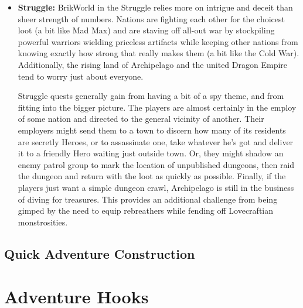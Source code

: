 \documentclass[12pt,a4paper,twocolumn]{article}
\begin{document}
\begin{itemize}
\item {\bf Struggle:} BrikWorld in the Struggle relies more on intrigue and deceit than sheer strength of numbers.  Nations are fighting each other for the choicest loot (a bit like Mad Max) and are staving off all-out war by stockpiling powerful warriors wielding priceless artifacts while keeping other nations from knowing exactly how strong that really makes them (a bit like the Cold War).  Additionally, the rising land of Archipelago and the united Dragon Empire tend to worry just about everyone.

Struggle quests generally gain from having a bit of a spy theme, and from fitting into the bigger picture.  The players are almost certainly in the employ of some nation and directed to the general vicinity of another.  Their employers might send them to a town to discern how many of its residents are secretly Heroes, or to assassinate one, take whatever he's got and deliver it to a friendly Hero waiting just outside town.  Or, they might shadow an enemy patrol group to mark the location of unpublished dungeons, then raid the dungeon and return with the loot as quickly as possible.  Finally, if the players just want a simple dungeon crawl, Archipelago is still in the business of diving for treasures.  This provides an additional challenge from being gimped by the need to equip rebreathers while fending off Lovecraftian monstrosities.  

\end{itemize} 

\subsection{Quick Adventure Construction}

\section{Adventure Hooks}
\end{document}
